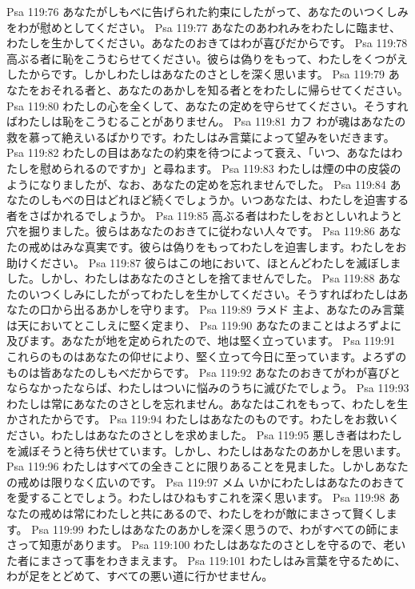 Psa 119:76  あなたがしもべに告げられた約束にしたがって、あなたのいつくしみをわが慰めとしてください。
Psa 119:77  あなたのあわれみをわたしに臨ませ、わたしを生かしてください。あなたのおきてはわが喜びだからです。
Psa 119:78  高ぶる者に恥をこうむらせてください。彼らは偽りをもって、わたしをくつがえしたからです。しかしわたしはあなたのさとしを深く思います。
Psa 119:79  あなたをおそれる者と、あなたのあかしを知る者とをわたしに帰らせてください。
Psa 119:80  わたしの心を全くして、あなたの定めを守らせてください。そうすればわたしは恥をこうむることがありません。
Psa 119:81  カフ わが魂はあなたの救を慕って絶えいるばかりです。わたしはみ言葉によって望みをいだきます。
Psa 119:82  わたしの目はあなたの約束を待つによって衰え、「いつ、あなたはわたしを慰められるのですか」と尋ねます。
Psa 119:83  わたしは煙の中の皮袋のようになりましたが、なお、あなたの定めを忘れませんでした。
Psa 119:84  あなたのしもべの日はどれほど続くでしょうか。いつあなたは、わたしを迫害する者をさばかれるでしょうか。
Psa 119:85  高ぶる者はわたしをおとしいれようと穴を掘りました。彼らはあなたのおきてに従わない人々です。
Psa 119:86  あなたの戒めはみな真実です。彼らは偽りをもってわたしを迫害します。わたしをお助けください。
Psa 119:87  彼らはこの地において、ほとんどわたしを滅ぼしました。しかし、わたしはあなたのさとしを捨てませんでした。
Psa 119:88  あなたのいつくしみにしたがってわたしを生かしてください。そうすればわたしはあなたの口から出るあかしを守ります。
Psa 119:89  ラメド 主よ、あなたのみ言葉は天においてとこしえに堅く定まり、
Psa 119:90  あなたのまことはよろずよに及びます。あなたが地を定められたので、地は堅く立っています。
Psa 119:91  これらのものはあなたの仰せにより、堅く立って今日に至っています。よろずのものは皆あなたのしもべだからです。
Psa 119:92  あなたのおきてがわが喜びとならなかったならば、わたしはついに悩みのうちに滅びたでしょう。
Psa 119:93  わたしは常にあなたのさとしを忘れません。あなたはこれをもって、わたしを生かされたからです。
Psa 119:94  わたしはあなたのものです。わたしをお救いください。わたしはあなたのさとしを求めました。
Psa 119:95  悪しき者はわたしを滅ぼそうと待ち伏せています。しかし、わたしはあなたのあかしを思います。
Psa 119:96  わたしはすべての全きことに限りあることを見ました。しかしあなたの戒めは限りなく広いのです。
Psa 119:97  メム いかにわたしはあなたのおきてを愛することでしょう。わたしはひねもすこれを深く思います。
Psa 119:98  あなたの戒めは常にわたしと共にあるので、わたしをわが敵にまさって賢くします。
Psa 119:99  わたしはあなたのあかしを深く思うので、わがすべての師にまさって知恵があります。
Psa 119:100  わたしはあなたのさとしを守るので、老いた者にまさって事をわきまえます。
Psa 119:101  わたしはみ言葉を守るために、わが足をとどめて、すべての悪い道に行かせません。
